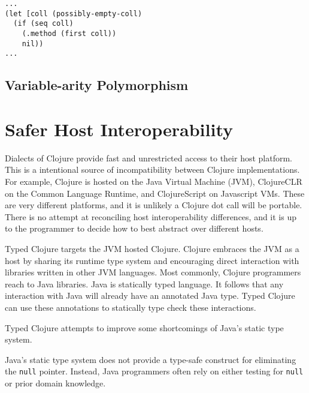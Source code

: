 \begin{lstlisting}[caption=Example of using the sequence abstraction with occurrence typing, label=lst:seqocc]
...
(let [coll (possibly-empty-coll)
  (if (seq coll)
    (.method (first coll))
    nil))
...
\end{lstlisting}

\subsection{Variable-arity Polymorphism}



\section{Safer Host Interoperability}

Dialects of Clojure provide fast and unrestricted access to their host platform. 
This is a intentional source of incompatibility between Clojure implementations.
For example, Clojure is hosted on the Java Virtual Machine (JVM), ClojureCLR on the Common Language Runtime,
and ClojureScript on Javascript VMs. These are very different platforms, and it is unlikely
a Clojure dot call will be portable. There is no attempt at reconciling
host interoperability differences, and it is up to the programmer to decide
how to best abstract over different hosts.

Typed Clojure targets the JVM hosted Clojure.
Clojure embraces the JVM as a host by sharing its runtime type system and encouraging direct
interaction with libraries written in other JVM languages. Most commonly, Clojure programmers
reach to Java libraries. Java is statically typed language. It follows that any interaction with
Java will already have an annotated Java type. Typed Clojure can use these annotations
to statically type check these interactions.

Typed Clojure attempts to improve some shortcomings of Java's static type system.

Java's static type system does not provide a type-safe construct for eliminating
the \lstinline|null| pointer. Instead, Java programmers often rely on either testing
for \lstinline|null| or prior domain knowledge.

